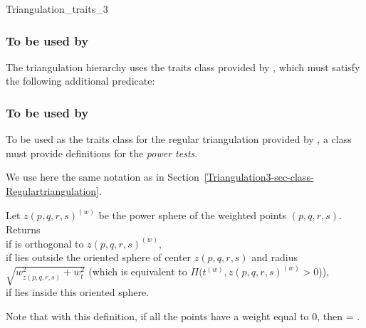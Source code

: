 \begin{ccRefConcept}{Triangulation_traits_3}
\subsubsection{To be used by \protect {}}

\ccDefinition

The triangulation hierarchy uses the traits class provided by
, which must satisfy the following additional predicate:



\subsubsection{To be used by \protect 
{}}

\ccDefinition

To be used as the traits class for the regular triangulation provided
by \cgal, a class must provide definitions for the \textit{power tests}.

We use here the same notation as in
Section~\ref{Triangulation3-sec-class-Regulartriangulation}. 


{Let ${z(p,q,r,s)}^{(w)}$ be the power sphere of the weighted points 
$(p,q,r,s)$. Returns \\
 if  is orthogonal to
${z(p,q,r,s)}^{(w)}$,\\ 
 if  lies outside the oriented sphere of
center $z(p,q,r,s)$ and radius $\sqrt{ w_{z(p,q,r,s)}^2 + w_t^2 }$
(which is equivalent to $\Pi({t}^{(w)},{z(p,q,r,s)}^{(w)} >0$)),\\
 if  lies inside this oriented sphere.
}

Note that with this definition, if all the points have a weight equal
to 0, then
 = .



\end{ccRefConcept}

